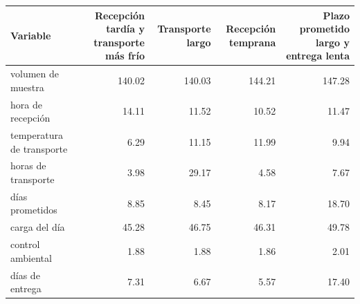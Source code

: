 \begin{tabular}{lrrrr}
\toprule
Variable & Recepción tardía y transporte más frío & Transporte largo & Recepción temprana & Plazo prometido largo y entrega lenta \\
\midrule
volumen de muestra & 140.02 & 140.03 & 144.21 & 147.28 \\
hora de recepción & 14.11 & 11.52 & 10.52 & 11.47 \\
temperatura de transporte & 6.29 & 11.15 & 11.99 & 9.94 \\
horas de transporte & 3.98 & 29.17 & 4.58 & 7.67 \\
días prometidos & 8.85 & 8.45 & 8.17 & 18.70 \\
carga del día & 45.28 & 46.75 & 46.31 & 49.78 \\
control ambiental & 1.88 & 1.88 & 1.86 & 2.01 \\
días de entrega & 7.31 & 6.67 & 5.57 & 17.40 \\
\bottomrule
\end{tabular}
